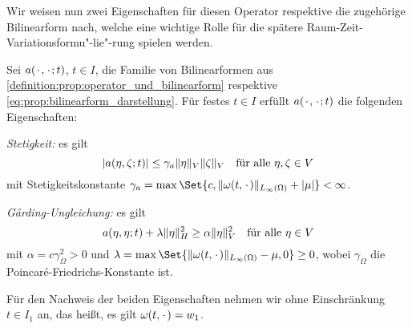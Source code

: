 Wir weisen nun zwei Eigenschaften für diesen Operator respektive die zugehörige Bilinearform nach, welche eine wichtige Rolle für die spätere Raum-Zeit-Variationsformu"-lie"-rung spielen werden.

\begin{Satz}
\label{satz:ps:rzvp:bilinearform_a_eigenschaften}
    Sei $a({\mkern2mu\cdot\mkern2mu}, {\mkern2mu\cdot\mkern2mu}; t)$, $t \in I$, die Familie von Bilinearformen aus \cref{definition:prop:operator_und_bilinearform} respektive \cref{eq:prop:bilinearform_darstellung}.
    Für festes $t \in I$ erfüllt $a({\mkern2mu\cdot\mkern2mu}, {\mkern2mu\cdot\mkern2mu}; t)$ die folgenden Eigenschaften:
    \begin{thmenumerate}
        \item\label{satz:ps:rzvp:bilinearform_a_eigenschaften_stetig}
        \emph{Stetigkeit:} es gilt
        \begin{equation}
            \label{eq:ps:rzvp:bilinearform_a_eigenschaften_stetig}
            \lvert a(\eta, \zeta; t)\rvert \leq \gamma_{a} \lVert\eta\rVert_{V} \lVert\zeta\rVert_{V} \quad \text{für alle}~\eta, \zeta \in V
        \end{equation}
        mit Stetigkeitskonstante $\gamma_{a} = \max\Set{c, \norm{\omega(t, \blank)}_{L_{\infty}(\Omega)} + \abs{\mu}} < \infty$.
        \item\label{satz:ps:rzvp:bilinearform_a_eigenschaften_garding}
        \emph{G\aa{}rding-Ungleichung:} es gilt
        \begin{equation}
            \label{eq:ps:rzvp:bilinearform_a_eigenschaften_garding}
            a(\eta, \eta; t) + \lambda \lVert\eta\rVert_{H}^{2} \geq \alpha \lVert\eta\rVert_{V}^{2} \quad \text{für alle}~\eta \in V
        \end{equation}
        mit $\alpha = c \gamma_{\Omega}^{2} > 0$ und $\lambda = \max\Set{\norm{\omega(t, \blank)}_{L_{\infty}(\Omega)} - \mu, 0} \geq 0$, wobei $\gamma_{\Omega}$ die Poincaré-Friedrichs-Konstante ist.
    \end{thmenumerate}

    \begin{Beweis}
        Für den Nachweis der beiden Eigenschaften nehmen wir ohne Einschränkung $t \in I_{1}$ an, das heißt, es gilt $\omega(t, {\mkern2mu\cdot\mkern2mu}) = w_{1}$.


\end{Beweis}
\end{Satz}
